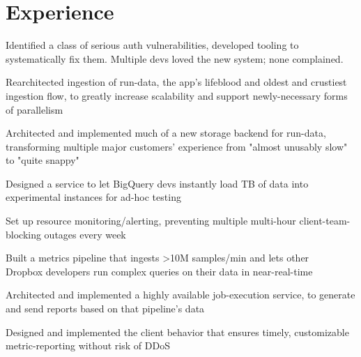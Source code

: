 \documentclass[]{resume}
\begin{document}
\begin{minipage}[t]{0.66\textwidth}




\section{Experience}


\vspace{\topsep} %
\begin{tightemize}
\item Identified a class of serious auth vulnerabilities, developed tooling to systematically fix them. Multiple devs loved the new system; none complained.
\item Rearchitected ingestion of run-data, the app's lifeblood and oldest and crustiest ingestion flow, to greatly increase scalability and support newly-necessary forms of parallelism
\item Architected and implemented much of a new storage backend for run-data, transforming multiple major customers' experience from "almost unusably slow" to "quite snappy"
\end{tightemize}
\sectionsep

\begin{tightemize}
\item Designed a service to let BigQuery devs instantly load TB of data into experimental instances for ad-hoc testing
\item Set up resource monitoring/alerting, preventing multiple multi-hour client-team-blocking outages every week
\end{tightemize}
\sectionsep
    
\begin{tightemize}
\item Built a metrics pipeline that ingests >10M samples/min and lets other \\ Dropbox developers run complex queries on their data in near-real-time
\item Architected and implemented a highly available job-execution service, to generate and send reports based on that pipeline's data
\item Designed and implemented the client behavior that ensures timely, customizable metric-reporting without risk of DDoS
\end{tightemize}
\sectionsep


\end{minipage}
\end{document}
